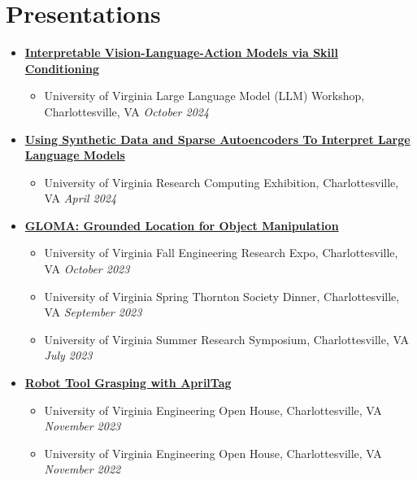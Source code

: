 \documentclass[letterpaper,11pt]{article}
\newcommand{\Date}[1]{\textit{\small #1}}
\begin{document}
\section{Presentations}
\begin{itemize}
  \item {\href{https://www.brandonyifanyang.com/skillvla.pdf}{\textbf{Interpretable Vision-Language-Action Models via Skill Conditioning}}}
        \begin{itemize}
          \item University of Virginia Large Language Model (LLM) Workshop, Charlottesville, VA \hfill \Date{October 2024}
        \end{itemize}
  \item {\href{https://www.brandonyifanyang.com/MI.pdf}{\textbf{Using Synthetic Data and Sparse Autoencoders To Interpret Large Language Models}}}
        \begin{itemize}
          \item University of Virginia Research Computing Exhibition, Charlottesville, VA \hfill \Date{April 2024}
        \end{itemize}
  \item \href{https://github.com/branyang02/GLOMA}{\textbf{GLOMA: Grounded Location for Object Manipulation}}
        \begin{itemize}
          \item University of Virginia Fall Engineering Research Expo, Charlottesville, VA \hfill \Date{October 2023}
          \item University of Virginia Spring Thornton Society Dinner, Charlottesville, VA \hfill \Date{September 2023}
          \item University of Virginia Summer Research Symposium, Charlottesville, VA \hfill \Date{July 2023}
        \end{itemize}
  \item \href{https://github.com/branyang02/apriltag_detection}{\textbf{Robot Tool Grasping with AprilTag}}
        \begin{itemize}
          \item University of Virginia Engineering Open House, Charlottesville, VA \hfill \Date{November 2023}
          \item University of Virginia Engineering Open House, Charlottesville, VA \hfill \Date{November 2022}
        \end{itemize}
\end{itemize}
\end{document}
